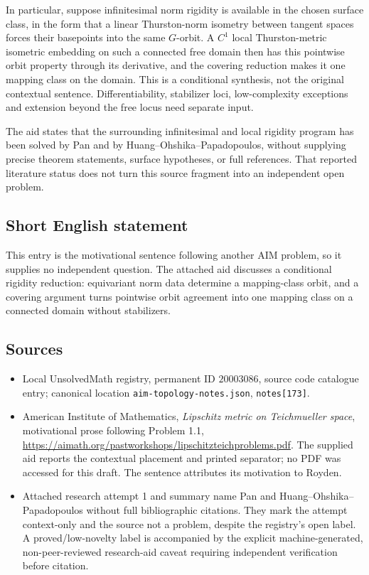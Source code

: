 \documentclass[11pt]{article}
\begin{document}
In particular, suppose infinitesimal norm rigidity is available in the chosen surface class, in the form that a linear Thurston-norm isometry between tangent spaces forces their basepoints into the same $G$-orbit. A $C^1$ local Thurston-metric isometric embedding on such a connected free domain then has this pointwise orbit property through its derivative, and the covering reduction makes it one mapping class on the domain. This is a conditional synthesis, not the original contextual sentence. Differentiability, stabilizer loci, low-complexity exceptions and extension beyond the free locus need separate input.

The aid states that the surrounding infinitesimal and local rigidity program has been solved by Pan and by Huang--Ohshika--Papadopoulos, without supplying precise theorem statements, surface hypotheses, or full references. That reported literature status does not turn this source fragment into an independent open problem.
\subsection{Short English statement}
This entry is the motivational sentence following another AIM problem, so it supplies no independent question. The attached aid discusses a conditional rigidity reduction: equivariant norm data determine a mapping-class orbit, and a covering argument turns pointwise orbit agreement into one mapping class on a connected domain without stabilizers.
\subsection{Sources}
\begin{itemize}
\item Local UnsolvedMath registry, permanent ID $20003086$, source code catalogue entry; canonical location \texttt{aim-topology-notes.json}, \texttt{notes[173]}.
\item American Institute of Mathematics, \emph{Lipschitz metric on Teichmueller space}, motivational prose following Problem 1.1, \url{https://aimath.org/pastworkshops/lipschitzteichproblems.pdf}. The supplied aid reports the contextual placement and printed separator; no PDF was accessed for this draft. The sentence attributes its motivation to Royden.
\item Attached research attempt 1 and summary name Pan and Huang--Ohshika--Papadopoulos without full bibliographic citations. They mark the attempt context-only and the source not a problem, despite the registry's open label. A proved/low-novelty label is accompanied by the explicit machine-generated, non-peer-reviewed research-aid caveat requiring independent verification before citation.
\end{itemize}
\end{document}
